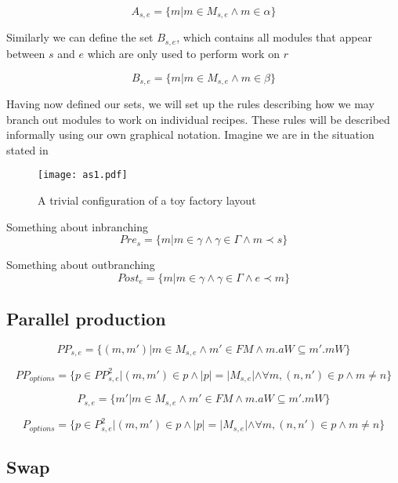 \[A_{s,e} = \{m |m \in M_{s,e} \land m \in \alpha\}\]

Similarly we can define the set $B_{s,e}$, which contains all modules that appear between $s$ and $e$ which are only used to perform work on $r$

\[B_{s,e} = \{m |m \in M_{s,e} \land m \in \beta\}\]

Having now defined our sets, we will set up the rules describing how we may branch out modules to work on individual recipes. These rules will be described informally using our own graphical notation. Imagine we are in the situation stated in 

\begin{figure}[h]
\centering
\texttt{[image: as1.pdf]}
\caption{A trivial configuration of a toy factory layout}
\label{fig:asbase}
\end{figure}


Something about inbranching
\[Pre_{s} = \{m | m \in \gamma \land \gamma \in \Gamma \land m \prec s\}\]

Something about outbranching
\[Post_{e} = \{m | m \in \gamma \land \gamma \in \Gamma \land e \prec  m \}\]



\subsection{Parallel production}

\[PP_{s, e} = \{(m, m')| m \in M_{s,e} \land m' \in FM \land m.aW \subseteq m'.mW\} \]

\[ PP_{options} = \{p \in {PP}_{s,e}^2 | (m,m') \in p \land |p| = |M_{s,e}| \land  \forall m , (n,n') \in p \land m \neq n \} \]


\[P_{s, e} = \{m'| m \in M_{s,e} \land m' \in FM \land m.aW \subseteq m'.mW\} \]

\[ P_{options} = \{p \in {P}_{s,e}^2 | (m,m') \in p \land |p| = |M_{s,e}| \land  \forall m , (n,n') \in p \land m \neq n \} \]


\subsection{Swap}


